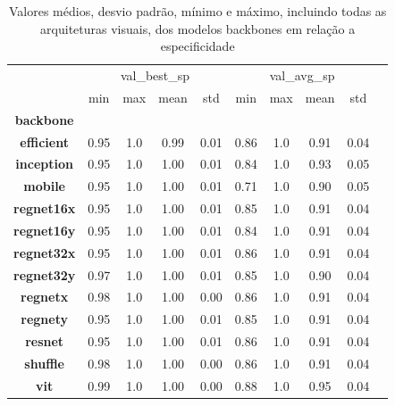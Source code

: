 \begin{table}
\centering
\caption{Valores médios, desvio padrão, mínimo e máximo, incluindo todas as arquiteturas visuais, dos modelos backbones em relação a especificidade}
\label{tab:spbackbone}
\begin{tabular}{c|c|c|c|c|c|c|c|c|c}
\toprule
{} & \multicolumn{4}{c|}{val\_best\_sp} & \multicolumn{4}{c|}{val\_avg\_sp} \\
{} &         min &  max &  mean &   std &        min &  max &  mean &   std \\
\textbf{backbone } &             &      &       &       &            &      &       &       \\
\midrule
\textbf{efficient} &        0.95 &  1.0 &  0.99 &  0.01 &       0.86 &  1.0 &  0.91 &  0.04 \\
\textbf{inception} &        0.95 &  1.0 &  1.00 &  0.01 &       0.84 &  1.0 &  0.93 &  0.05 \\
\textbf{mobile   } &        0.95 &  1.0 &  1.00 &  0.01 &       0.71 &  1.0 &  0.90 &  0.05 \\
\textbf{regnet16x} &        0.95 &  1.0 &  1.00 &  0.01 &       0.85 &  1.0 &  0.91 &  0.04 \\
\textbf{regnet16y} &        0.95 &  1.0 &  1.00 &  0.01 &       0.84 &  1.0 &  0.91 &  0.04 \\
\textbf{regnet32x} &        0.95 &  1.0 &  1.00 &  0.01 &       0.86 &  1.0 &  0.91 &  0.04 \\
\textbf{regnet32y} &        0.97 &  1.0 &  1.00 &  0.01 &       0.85 &  1.0 &  0.90 &  0.04 \\
\textbf{regnetx  } &        0.98 &  1.0 &  1.00 &  0.00 &       0.86 &  1.0 &  0.91 &  0.04 \\
\textbf{regnety  } &        0.95 &  1.0 &  1.00 &  0.01 &       0.85 &  1.0 &  0.91 &  0.04 \\
\textbf{resnet   } &        0.95 &  1.0 &  1.00 &  0.01 &       0.86 &  1.0 &  0.91 &  0.04 \\
\textbf{shuffle  } &        0.98 &  1.0 &  1.00 &  0.00 &       0.86 &  1.0 &  0.91 &  0.04 \\
\textbf{vit      } &        0.99 &  1.0 &  1.00 &  0.00 &       0.88 &  1.0 &  0.95 &  0.04 \\
\bottomrule
\end{tabular}
\end{table}
